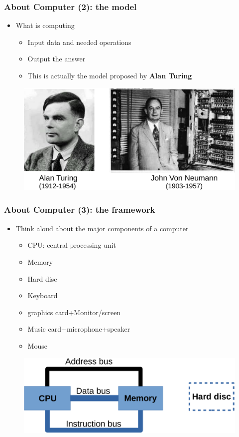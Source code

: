 \begin{frame}
\frametitle{About Computer (2): the model}
\begin{itemize}
	\item {What is computing}
	\begin{itemize}
		\item {Input data and needed operations}
		\item {Output the answer}
	\end{itemize}
	\begin{itemize}
		\item {This is actually the model proposed by \textbf{Alan Turing}}
	\end{itemize}
\end{itemize}
\begin{figure}
	\includegraphics[width=0.8\linewidth]{figs/turing.pdf}
\end{figure}
\end{frame}

\begin{frame}
\frametitle{About Computer (3): the framework}
\begin{itemize}
	\item {Think aloud about the major components of a computer}
	\begin{itemize}
		\item {CPU: central processing unit}
		\item {Memory}
		\item {Hard disc}
		\item {Keyboard}
		\item {graphics card+Monitor/screen}
		\item {Music card+microphone+speaker}
		\item {Mouse}
	\end{itemize}
\end{itemize}
\begin{figure}
	\includegraphics[width=0.7\linewidth]{figs/framework.pdf}
\end{figure}
\end{frame}

